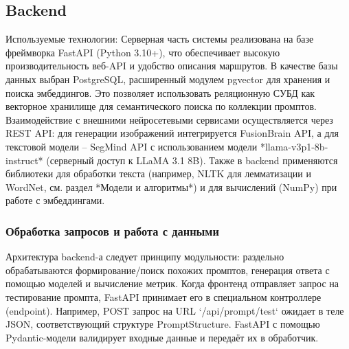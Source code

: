 \subsection{Backend}
Используемые технологии: Серверная часть системы реализована на базе фреймворка FastAPI (Python 3.10+), что обеспечивает высокую производительность веб-API и удобство описания маршрутов. В качестве базы данных выбран PostgreSQL, расширенный модулем pgvector для хранения и поиска эмбеддингов. Это позволяет использовать реляционную СУБД как векторное хранилище для семантического поиска по коллекции промптов. Взаимодействие с внешними нейросетевыми сервисами осуществляется через REST API: для генерации изображений интегрируется FusionBrain API, а для текстовой модели – SegMind API с использованием модели *llama-v3p1-8b-instruct* (серверный доступ к LLaMA 3.1 8B). Также в backend применяются библиотеки для обработки текста (например, NLTK для лемматизации и WordNet, см. раздел *Модели и алгоритмы*) и для вычислений (NumPy) при работе с эмбеддингами.
\subsubsection{Обработка запросов и работа с данными}

Архитектура backend-а следует принципу модульности: раздельно обрабатываются формирование/поиск похожих промптов, генерация ответа с помощью моделей и вычисление метрик. Когда фронтенд отправляет запрос на тестирование промпта, FastAPI принимает его в специальном контроллере (endpoint). Например, POST запрос на URL `/api/prompt/test` ожидает в теле JSON, соответствующий структуре PromptStructure. FastAPI с помощью Pydantic-модели валидирует входные данные и передаёт их в обработчик.

